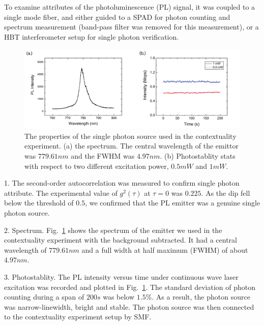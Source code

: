 \documentclass[pra,aps,notitlepage,superscriptaddress,showpacs,showkeys]{revtex4-1}
\theoremstyle{definition}
\theoremstyle{remark}
\begin{document}
 To examine attributes of the photoluminescence (PL) signal, it was coupled to a single mode fiber, and either guided to a SPAD for photon counting and spectrum measurement (band-pass filter was removed for this measurement), or a HBT interferometer setup for single photon verification.

 \begin{figure}[htbp]
     \centering
     \includegraphics[width = .96 \linewidth]{fig/exp-sauce.pdf}
     \caption{The properties of the single photon source used in the contextuality experiment. (a) the spectrum. The central wavelength of the emittor was $779.61nm$ and the FWHM was $4.97nm$. (b) Photostablity stats with respect to two different excitation power, $0.5mW$ and $1mW$.}
     \label{fig:exp-sauce}
 \end{figure}

 1. The second-order autocorrelation was measured to confirm single photon attribute. The experimental value of $g^2(\tau)$ at $\tau = 0$ was $0.225$. As the dip fell below the threshold of $0.5$, we confirmed that the PL emitter was a genuine single photon source.

 2. Spectrum. Fig.~\ref{fig:exp-sauce} shows the spectrum of the emitter we used in the contextuality experiment with the background subtracted. It had a central wavelength of $779.61nm$ and a full width at half maximum (FWHM) of about $4.97nm$.

 3. Photostablity. The PL intensity versus time under continuous wave laser excitation was recorded and plotted in Fig.~\ref{fig:exp-sauce}. The standard deviation of photon counting during a span of $200s$ was below $1.5\%$.
 As a result, the photon source was narrow-linewidth, bright and stable. The photon source was then connected to the contextuality experiment setup by SMF.
\end{document}
